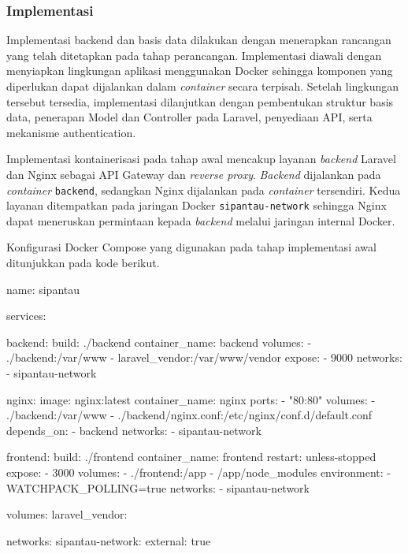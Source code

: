 \subsubsection{Implementasi}

Implementasi backend dan basis data dilakukan dengan menerapkan rancangan yang telah ditetapkan pada tahap perancangan. Implementasi diawali dengan menyiapkan lingkungan aplikasi menggunakan Docker sehingga komponen yang diperlukan dapat dijalankan dalam \textit{container} secara terpisah. Setelah lingkungan tersebut tersedia, implementasi dilanjutkan dengan pembentukan struktur basis data, penerapan Model dan Controller pada Laravel, penyediaan API, serta mekanisme authentication.

Implementasi kontainerisasi pada tahap awal mencakup layanan \textit{backend} Laravel dan Nginx sebagai API Gateway dan \textit{reverse proxy}. \textit{Backend} dijalankan pada \textit{container} \texttt{backend}, sedangkan Nginx dijalankan pada \textit{container} tersendiri. Kedua layanan ditempatkan pada jaringan Docker \texttt{sipantau-network} sehingga Nginx dapat meneruskan permintaan kepada \textit{backend} melalui jaringan internal Docker.

Konfigurasi Docker Compose yang digunakan pada tahap implementasi awal ditunjukkan pada kode berikut.

\begin{code}
\begin{ignasicblock}
name: sipantau

services:

  backend:
    build: ./backend
    container_name: backend
    volumes:
      - ./backend:/var/www
      - laravel_vendor:/var/www/vendor
    expose:
      - 9000
    networks:
      - sipantau-network

  nginx:
    image: nginx:latest
    container_name: nginx
    ports:
      - "80:80"
    volumes:
      - ./backend:/var/www
      - ./backend/nginx.conf:/etc/nginx/conf.d/default.conf
    depends_on:
      - backend
    networks:
      - sipantau-network

  frontend:
    build: ./frontend
    container_name: frontend
    restart: unless-stopped
    expose:
      - 3000
    volumes:
      - ./frontend:/app
      - /app/node_modules
    environment:
      - WATCHPACK_POLLING=true
    networks:
      - sipantau-network

volumes:
  laravel_vendor:

networks:
  sipantau-network:
    external: true
\end{ignasicblock}
\end{code}

